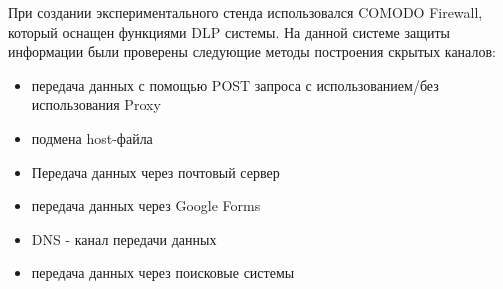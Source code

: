При создании экспериментального стенда использовался COMODO Firewall, который оснащен функциями DLP системы. На данной системе защиты информации были проверены следующие методы построения скрытых каналов:

\begin{itemize}

	\item передача данных с помощью POST запроса с использованием/без использования Proxy
	
	\item
	    подмена host-файла
	
	\item Передача данных через почтовый сервер
	
	\item передача данных через Google Forms
	
	\item 
	    DNS - канал передачи данных
	    
	\item передача данных через поисковые системы
\end{itemize}